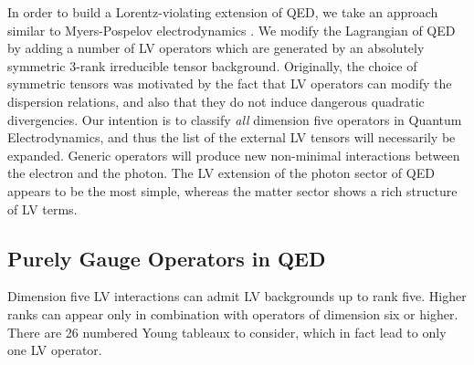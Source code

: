 \documentclass[12pt,preprintnumbers,nofootinbib]{revtex4}
\begin{document}
	In order to build a Lorentz-violating extension of QED, we take an approach
	similar to Myers-Pospelov electrodynamics
\cite{MP:}.
	We modify the Lagrangian of QED by adding
	a number of LV operators which are generated by an absolutely
	symmetric 3-rank irreducible tensor background.
	Originally, the choice of symmetric tensors was motivated by the fact that
	LV operators can modify the dispersion relations, and also that
	they do not induce dangerous quadratic divergencies.
Our intention is to classify {\it all} dimension five operators in 
	Quantum Electrodynamics, and thus the list of the external LV tensors will 
necessarily be expanded. 
	Generic operators will produce new non-minimal interactions between
	the electron and the photon. 
	The LV extension of the photon sector of QED appears to be the most simple, whereas
	the matter sector shows a rich structure of LV terms.

\subsection{Purely Gauge Operators in QED}

	Dimension five LV interactions can admit LV backgrounds up to rank five.
	Higher ranks can appear only in combination with operators of dimension six or higher.
	There are 26 numbered Young tableaux to consider, which in fact 
	lead to only one LV operator.
\end{document}
